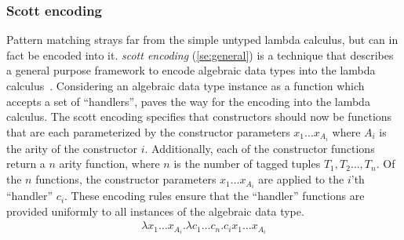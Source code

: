 \subsubsection{Scott encoding}
Pattern matching strays far from the simple untyped lambda calculus, but can in fact be encoded into it.
\textit{scott encoding} (\autoref{se:general}) is a technique that describes a general purpose framework to encode algebraic data types into the lambda calculus~\cite{scott1962system}.
Considering an algebraic data type instance as a function which accepts a set of ``handlers'', paves the way for the encoding into the lambda calculus.
The scott encoding specifies that constructors should now be functions that are each parameterized by the constructor parameters $x_1 \dots x_{A_i}$ where $A_i$ is the arity of the constructor $i$.
Additionally, each of the constructor functions return a $n$ arity function, where $n$ is the number of tagged tuples $T_1, T_2 \dots , T_n$.
Of the $n$ functions, the constructor parameters $x_1 \dots x_{A_i}$ are applied to the $i$'th ``handler'' $c_i$.
These encoding rules ensure that the ``handler'' functions are provided uniformly to all instances of the algebraic data type.
\begin{align}
    \lambda x_1 \dots x_{A_i}. \lambda c_1 \dots c_n. c_i x_1 \dots x_{A_i}
\label{se:general}
\end{align}
